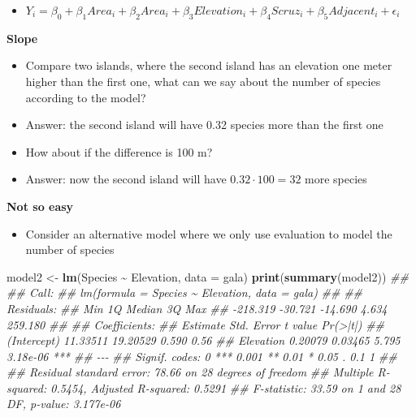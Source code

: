 \documentclass[
]{book}
\newenvironment{Shaded}{\begin{snugshade}}{\end{snugshade}}
\newcommand{\CommentTok}[1]{\textcolor[rgb]{0.56,0.35,0.01}{\textit{#1}}}
\newcommand{\DataTypeTok}[1]{\textcolor[rgb]{0.13,0.29,0.53}{#1}}
\newcommand{\KeywordTok}[1]{\textcolor[rgb]{0.13,0.29,0.53}{\textbf{#1}}}
\newcommand{\NormalTok}[1]{#1}
\newcommand{\OperatorTok}[1]{\textcolor[rgb]{0.81,0.36,0.00}{\textbf{#1}}}
\newcommand{\StringTok}[1]{\textcolor[rgb]{0.31,0.60,0.02}{#1}}
\providecommand{\tightlist}{%
  \setlength{\itemsep}{0pt}\setlength{\parskip}{0pt}}
\theoremstyle{definition}
\theoremstyle{definition}
\theoremstyle{definition}
\theoremstyle{remark}
\begin{document}
\begin{itemize}
\tightlist
\item
  \(Y_i = \beta_0 + \beta_1 Area_i + \beta_2 Area_i + \beta_3 Elevation_i + \beta_4 Scruz_i + \beta_5 Adjacent_i + \epsilon_i\)
\end{itemize}

\textbf{Slope}

\begin{itemize}
\tightlist
\item
  Compare two islands, where the second island has an elevation one meter higher than the first one, what can we say about the number of species according to the model?
\item
  Answer: the second island will have 0.32 species more than the first one
\item
  How about if the difference is 100 m?
\item
  Answer: now the second island will have \(0.32 \cdot 100 = 32\) more species
\end{itemize}

\textbf{Not so easy}

\begin{itemize}
\tightlist
\item
  Consider an alternative model where we only use evaluation to model the number of species
\end{itemize}

\begin{Shaded}
\begin{Highlighting}[]
\NormalTok{model2 \textless{}{-}}\StringTok{ }\KeywordTok{lm}\NormalTok{(Species }\OperatorTok{\textasciitilde{}}\StringTok{ }\NormalTok{Elevation, }\DataTypeTok{data =}\NormalTok{ gala)}
\KeywordTok{print}\NormalTok{(}\KeywordTok{summary}\NormalTok{(model2))}
\CommentTok{\#\# }
\CommentTok{\#\# Call:}
\CommentTok{\#\# lm(formula = Species \textasciitilde{} Elevation, data = gala)}
\CommentTok{\#\# }
\CommentTok{\#\# Residuals:}
\CommentTok{\#\#      Min       1Q   Median       3Q      Max }
\CommentTok{\#\# {-}218.319  {-}30.721  {-}14.690    4.634  259.180 }
\CommentTok{\#\# }
\CommentTok{\#\# Coefficients:}
\CommentTok{\#\#             Estimate Std. Error t value Pr(\textgreater{}|t|)    }
\CommentTok{\#\# (Intercept) 11.33511   19.20529   0.590     0.56    }
\CommentTok{\#\# Elevation    0.20079    0.03465   5.795 3.18e{-}06 ***}
\CommentTok{\#\# {-}{-}{-}}
\CommentTok{\#\# Signif. codes:  0 \textquotesingle{}***\textquotesingle{} 0.001 \textquotesingle{}**\textquotesingle{} 0.01 \textquotesingle{}*\textquotesingle{} 0.05 \textquotesingle{}.\textquotesingle{} 0.1 \textquotesingle{} \textquotesingle{} 1}
\CommentTok{\#\# }
\CommentTok{\#\# Residual standard error: 78.66 on 28 degrees of freedom}
\CommentTok{\#\# Multiple R{-}squared:  0.5454,	Adjusted R{-}squared:  0.5291 }
\CommentTok{\#\# F{-}statistic: 33.59 on 1 and 28 DF,  p{-}value: 3.177e{-}06}
\end{Highlighting}
\end{Shaded}
\end{document}
